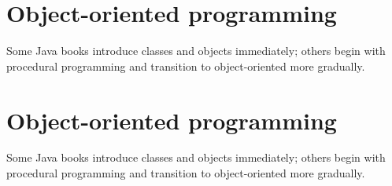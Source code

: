 \section*{Object-oriented programming}

Some Java books introduce classes and objects immediately; others begin with procedural programming and transition to object-oriented more gradually.

\section{Object-oriented programming}

Some Java books introduce classes and objects immediately; others begin with procedural programming and transition to object-oriented more gradually.
